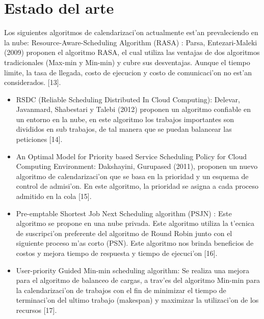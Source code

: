 \section*{Estado del arte}

Los siguientes algoritmos de calendarizaci'on actualmente est'an prevaleciendo en la nube:
Resource-Aware-Scheduling Algorithm (RASA) :  Parsa, Entezari-Maleki (2009) proponen el algoritmo RASA, el cual utiliza las ventajas de dos algoritmos tradicionales (Max-min y Min-min) y cubre sus desventajas. Aunque el tiempo limite, la tasa de llegada, costo de ejecucion y costo de comunicaci'on no est'an considerados. [13].

\begin{itemize}
\item RSDC (Reliable Scheduling Distributed In Cloud Computing): Delevar, Javanmard, Shabestari y Talebi (2012) proponen un algoritmo confiable en un entorno en la nube, en este algoritmo los trabajos importantes son divididos en sub trabajos, de tal manera que se puedan balancear las peticiones [14].


\item An Optimal Model for Priority based Service Scheduling Policy for Cloud Computing Environment: Dakshayini, Gurupased (2011), proponen un nuevo algoritmo de calendarizaci'on que se basa en la prioridad y un esquema de control de admisi'on. En este algoritmo, la prioridad se asigna a cada proceso admitido en la cola [15]. 


\item Pre-emptable Shortest Job Next Scheduling algorithm (PSJN) :  Este algoritmo se propone en una nube privada. Este algoritmo utiliza la t'ecnica de suscripci'on preferente del algoritmo de Round Robin junto con el siguiente proceso m'as corto (PSN). Este algoritmo nos brinda beneficios de costos y mejora tiempo de respuesta y tiempo de ejecuci'on [16]. 


\item User-priority Guided Min-min scheduling algorithm: Se realiza una mejora para el algoritmo de balanceo de cargas, a trav'es del algoritmo Min-min para la calendarizaci'on de trabajos con el fin de minimizar el tiempo de terminaci'on del ultimo trabajo (makespan) y maximizar la utilizaci'on de los recursos [17]. 
\end{itemize}


